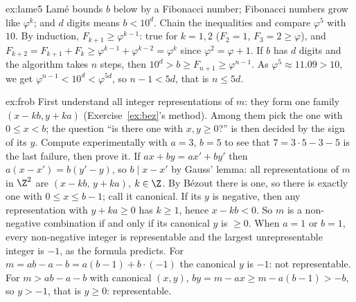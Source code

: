 \begin{solution}{ex:lame5}
\idea Lam\'e bounds $b$ below by a Fibonacci number; Fibonacci numbers grow like $\varphi^k$; and $d$ digits means $b<10^d$. Chain the inequalities and compare $\varphi^5$ with $10$.
\writeup By induction, $F_{k+1}\ge\varphi^{k-1}$: true for $k=1,2$ ($F_2=1$, $F_3=2\ge\varphi$), and $F_{k+2}=F_{k+1}+F_k\ge\varphi^{k-1}+\varphi^{k-2}=\varphi^k$ since $\varphi^2=\varphi+1$. If $b$ has $d$ digits and the algorithm takes $n$ steps, then $10^d>b\ge F_{n+1}\ge\varphi^{n-1}$. As $\varphi^5\approx11.09>10$, we get $\varphi^{n-1}<10^d<\varphi^{5d}$, so $n-1<5d$, that is $n\le5d$.
\end{solution}

\begin{solution}{ex:frob}
\idea First understand all integer representations of $m$: they form one family $(x-kb,y+ka)$ (Exercise~\ref{ex:bez}'s method). Among them pick the one with $0\le x<b$; the question ``is there one with $x,y\ge0$?'' is then decided by the sign of its $y$. Compute experimentally with $a=3$, $b=5$ to see that $7=3\cdot5-3-5$ is the last failure, then prove it.
\writeup If $ax+by=ax'+by'$ then $a(x-x')=b(y'-y)$, so $b\mid x-x'$ by Gauss' lemma: all representations of $m$ in $\Z^2$ are $(x-kb,\,y+ka)$, $k\in\Z$. By B\'ezout there is one, so there is exactly one with $0\le x\le b-1$; call it canonical.
If its $y$ is negative, then any representation with $y+ka\ge0$ has $k\ge1$, hence $x-kb<0$. So $m$ is a non-negative combination if and only if its canonical $y$ is $\ge0$.
When $a=1$ or $b=1$, every non-negative integer is representable and the largest unrepresentable integer is $-1$, as the formula predicts. For $m=ab-a-b=a(b-1)+b\cdot(-1)$ the canonical $y$ is $-1$: not representable. For $m>ab-a-b$ with canonical $(x,y)$, $by=m-ax\ge m-a(b-1)>-b$, so $y>-1$, that is $y\ge0$: representable.
\end{solution}

